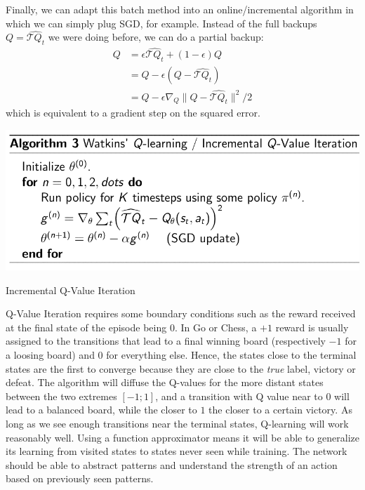 \documentclass{tufte-handout}
\begin{document}
Finally, we can adapt this batch method into an online/incremental algorithm in which we can simply plug SGD, for example. Instead of the full backups $Q = \widehat{\mathcal{T} Q_t}$ we were doing before, we can do a partial backup:
\vspace{-23pt}
\begin{align*}
Q &= \epsilon \widehat{\mathcal{T} Q_t} + (1-\epsilon)Q \\
  &= Q - \epsilon (Q - \widehat{\mathcal{T} Q_t} ) \\
  &= Q - \epsilon \nabla_Q \| Q - \widehat{\mathcal{T} Q_t} \|^2 / 2
\end{align*} which is equivalent to a gradient step on the squared error. 
\begin{marginfigure}[-3cm]
  \includegraphics[width=\linewidth]{wat}
  \caption{Incremental Q-Value Iteration}
\end{marginfigure}

\begin{fullwidth}
Q-Value Iteration requires some boundary conditions such as the reward received at the final state of the episode being $0$. In Go or Chess, a $+1$ reward is usually assigned to the transitions that lead to a final winning board (respectively $-1$ for a loosing board) and $0$ for everything else. Hence, the states close to the terminal states are the first to converge because they are close to the \emph{true} label, victory or defeat. The algorithm will diffuse the Q-values for the more distant states between the two extremes $[-1;1]$, and a transition with Q value near to 0 will lead to a balanced board, while the closer to $1$ the closer to a certain victory. As long as we see enough transitions near the terminal states, Q-learning will work reasonably well. Using a function approximator means it will be able to generalize its learning from visited states to states never seen while training. The network should be able to abstract patterns and understand the strength of an action based on previously seen patterns.
\end{fullwidth}
\end{document}
